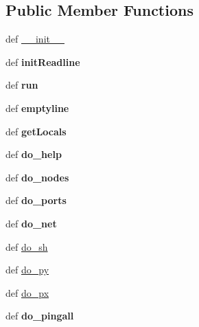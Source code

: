 \subsection*{Public Member Functions}
\begin{DoxyCompactItemize}
\item 
def \hyperlink{classmininet_1_1cli_1_1CLI_a8a7159a07a77a05fd9fa083d212f3012}{\-\_\-\-\_\-init\-\_\-\-\_\-}
\item 
\hypertarget{classmininet_1_1cli_1_1CLI_acb783f2a3affc84260cce2d5090260e0}{def {\bfseries init\-Readline}}\label{classmininet_1_1cli_1_1CLI_acb783f2a3affc84260cce2d5090260e0}

\item 
\hypertarget{classmininet_1_1cli_1_1CLI_a3d7edb1ba3b4635527f07823d2b1bcca}{def {\bfseries run}}\label{classmininet_1_1cli_1_1CLI_a3d7edb1ba3b4635527f07823d2b1bcca}

\item 
\hypertarget{classmininet_1_1cli_1_1CLI_a3c69fb5b0a23d1fdf59ae2a768561be3}{def {\bfseries emptyline}}\label{classmininet_1_1cli_1_1CLI_a3c69fb5b0a23d1fdf59ae2a768561be3}

\item 
\hypertarget{classmininet_1_1cli_1_1CLI_ab1617010c175d74b86f034091fe65c90}{def {\bfseries get\-Locals}}\label{classmininet_1_1cli_1_1CLI_ab1617010c175d74b86f034091fe65c90}

\item 
\hypertarget{classmininet_1_1cli_1_1CLI_adb2ea450f367d3a480ab4b1e70e60a78}{def {\bfseries do\-\_\-help}}\label{classmininet_1_1cli_1_1CLI_adb2ea450f367d3a480ab4b1e70e60a78}

\item 
\hypertarget{classmininet_1_1cli_1_1CLI_a25ae0fcb8e3538bdd93dbab7e0b59ee1}{def {\bfseries do\-\_\-nodes}}\label{classmininet_1_1cli_1_1CLI_a25ae0fcb8e3538bdd93dbab7e0b59ee1}

\item 
\hypertarget{classmininet_1_1cli_1_1CLI_aa63c97091c9ad85695de96046661f123}{def {\bfseries do\-\_\-ports}}\label{classmininet_1_1cli_1_1CLI_aa63c97091c9ad85695de96046661f123}

\item 
\hypertarget{classmininet_1_1cli_1_1CLI_a96a020a13653c2b4e504c270a560bd98}{def {\bfseries do\-\_\-net}}\label{classmininet_1_1cli_1_1CLI_a96a020a13653c2b4e504c270a560bd98}

\item 
def \hyperlink{classmininet_1_1cli_1_1CLI_a4df722296f69ca6f19f8fd89ea225042}{do\-\_\-sh}
\item 
def \hyperlink{classmininet_1_1cli_1_1CLI_abaee39bdb77c8ba35182e27a6e12d0a1}{do\-\_\-py}
\item 
def \hyperlink{classmininet_1_1cli_1_1CLI_ad4f829fe3e8105087a9f8a94b1fa05e9}{do\-\_\-px}
\item 
\hypertarget{classmininet_1_1cli_1_1CLI_a678d2542cce2e80baedb1bd7cece9a15}{def {\bfseries do\-\_\-pingall}}\label{classmininet_1_1cli_1_1CLI_a678d2542cce2e80baedb1bd7cece9a15}


\end{DoxyCompactItemize}
